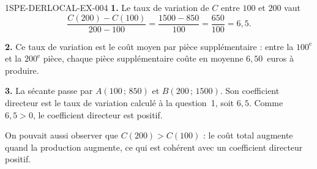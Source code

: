 \begin{corrige}{1SPE-DERLOCAL-EX-004}
\textbf{1.} Le taux de variation de $C$ entre $100$ et $200$ vaut
\[
\frac{C(200)-C(100)}{200-100}=\frac{1500-850}{100}=\frac{650}{100}=6{,}5.
\]

\textbf{2.} Ce taux de variation est le coût moyen par pièce supplémentaire : entre la $100^{\text{e}}$ et la $200^{\text{e}}$ pièce, chaque pièce supplémentaire coûte en moyenne $6{,}50$~euros à produire.

\textbf{3.} La sécante passe par $A(100\,;\,850)$ et $B(200\,;\,1500)$. Son coefficient directeur est le taux de variation calculé à la question~1, soit $6{,}5$. Comme $6{,}5>0$, le coefficient directeur est positif.

On pouvait aussi observer que $C(200)>C(100)$ : le coût total augmente quand la production augmente, ce qui est cohérent avec un coefficient directeur positif.
\end{corrige}
